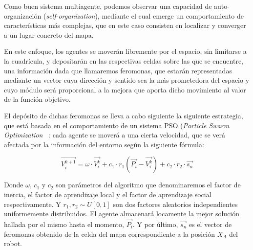 \documentclass[runningheads]{llncs}
\begin{document}
    Como buen sistema multiagente, podemos observar una capacidad de auto-organización (\textit{self-organization}), mediante el cual emerge un comportamiento de características más complejas, que en este caso consisten en localizar y converger a un lugar concreto del mapa.

    En este enfoque, los agentes se moverán libremente por el espacio, sin limitarse a la cuadrícula, y depositarán en las respectivas celdas sobre las que se encuentre, una información dada que llamaremos feromonas, que estarán representadas mediante un vector cuya dirección y sentido sea la más prometedora del espacio y cuyo módulo será proporcional a la mejora que aporta dicho movimiento al valor de la función objetivo.

    El depósito de dichas feromonas se lleva a cabo siguiente la siguiente estrategia, que está basada en el comportamiento de un sistema PSO (\textit{Particle Swarm Optimization} ~\cite{PSO}: cada agente se moverá a una cierta velocidad, que se verá afectada por la información del entorno según la siguiente fórmula:


    \[
        \vec{V_i^{k+1}} = \omega \cdot \vec{V_i^k} + c_1 \cdot r_1(\vec{P_i} - \vec{V_i^k}) + c_2 \cdot r_2 \cdot \vec{s_n}
    \]

    Donde $\omega$, $c_1$ y $c_2$ son parámetros del algoritmo que denominaremos el factor de inercia, el factor de aprendizaje local y el factor de aprendizaje social respectivamente. Y $r_1, r_2 \sim U[0,1]$ son dos factores aleatorios independientes uniformemente distribuidos.
    El agente almacenará locamente la mejor solución hallada por el mismo hasta el momento, $\vec{P_i}$.
    Y por último, $\vec{s_n}$ es el vector de feromonas obtenido de la celda del mapa correspondiente a la posición $X_A$ del robot.
\end{document}
